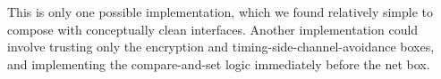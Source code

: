\documentclass{article}
\newcommand{\trusted}[1]{*++[o][F=]{#1}}
\newcommand{\untrusted}[1]{*++[o][F-]{#1}}
\newcommand{\fullwidth}[1]{\noindent\checkoddpage\makebox[0pt][r]{\makebox[\dimexpr1in+\hoffset+\ifoddpage\oddsidemargin\else\evensidemargin\fi][l]{#1}}}
\newcommand{\truecenter}[1]{\fullwidth{\parbox[c]{\paperwidth}{#1}}}
\begin{document}
This is only one possible implementation, which we found relatively simple to compose with conceptually clean interfaces.  Another implementation could involve trusting only the encryption and timing-side-channel-avoidance boxes, and implementing the compare-and-set logic immediately before the net box.
\end{document}

